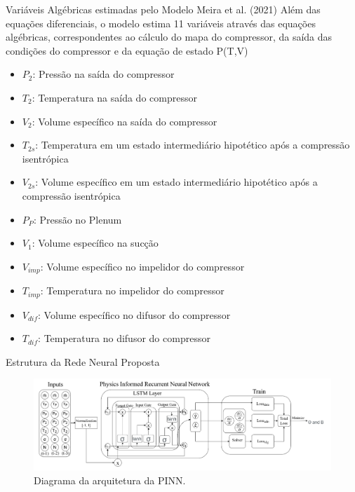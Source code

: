 \begin{frame}{Variáveis Algébricas estimadas pelo Modelo Meira et al. (2021)}
    \scriptsize
    Além das equações diferenciais, o modelo estima 11 variáveis através das equações algébricas, correspondentes ao cálculo do mapa do compressor, da saída das condições do compressor e da equação de estado P(T,V)

    \vspace{0.3cm}

    \begin{multicols}{2}
    \begin{itemize}
        \item \( P_2 \): Pressão na saída do compressor
        \item \( T_2 \): Temperatura na saída do compressor
        \item \( V_2 \): Volume específico na saída do compressor
        \item \( T_{2s} \): Temperatura em um estado intermediário hipotético após a compressão isentrópica
        \item \( V_{2s} \): Volume específico em um estado intermediário hipotético após a compressão isentrópica
        \item \( P_P \): Pressão no Plenum
    \end{itemize}

    \columnbreak

    \begin{itemize}
        \item \( V_1 \): Volume específico na sucção
        \item \( V_{imp} \): Volume específico no impelidor do compressor
        \item \( T_{imp} \): Temperatura no impelidor do compressor
        \item \( V_{dif} \): Volume específico no difusor do compressor
        \item \( T_{dif} \): Temperatura no difusor do compressor
    \end{itemize}
    \end{multicols}

    \vspace{0.2cm}

    \end{frame}
\begin{frame}{Estrutura da Rede Neural Proposta}
    \vspace{-0.3cm}
    \begin{figure}
        \centering
        \includegraphics[width=1.0\textwidth]{figures/PIRNN.png} %
        \caption{\small Diagrama da arquitetura da PINN.}
    \end{figure}
\end{frame}
